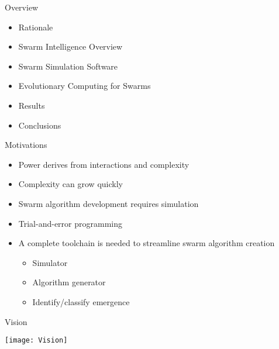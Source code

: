 \begin{slide}{Overview}
  \begin{itemize}
  \item Rationale
  \item Swarm Intelligence Overview
  \item Swarm Simulation Software
  \item Evolutionary Computing for Swarms
  \item Results
  \item Conclusions
  \end{itemize}
\end{slide}


\begin{slide}{Motivations}
  \begin{itemize}
    \item Power derives from interactions and complexity
    \item Complexity can grow quickly
    \item Swarm algorithm development requires simulation
    \item Trial-and-error programming
    \item A complete toolchain is needed to streamline swarm algorithm creation
      \begin{itemize}
      \item Simulator
      \item Algorithm generator
      \item Identify/classify emergence
      \end{itemize}
  \end{itemize}
\end{slide}


\begin{slide}{Vision}
  
  \begin{minipage}{\textwidth}
    \centering
    \texttt{[image: Vision]}
  \end{minipage}
\end{slide}

